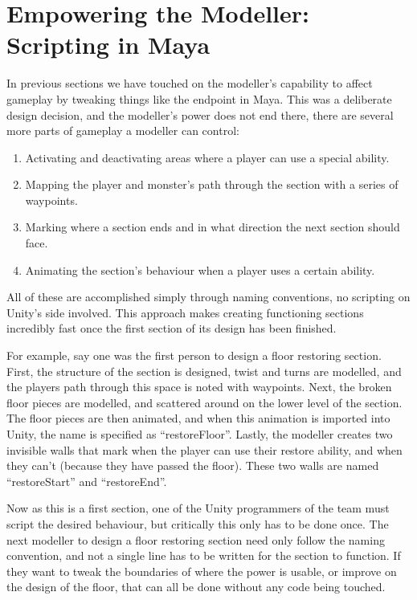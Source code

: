 \documentclass[a4paper,oneside]{memoir}
\begin{document}
		\section{Empowering the Modeller: Scripting in Maya}

			In previous sections we have touched on the modeller's capability to affect gameplay by tweaking things like the endpoint in Maya. 
			This was a deliberate design decision, and the modeller's power does not end there, there are several more parts of gameplay a modeller can control:

				\begin{enumerate}
					\item Activating and deactivating areas where a player can use a special ability.
					\item Mapping the player and monster's path through the section with a series of waypoints.
					\item Marking where a section ends and in what direction the next section should face.
					\item Animating the section's behaviour when a player uses a certain ability.
				\end{enumerate}

			All of these are accomplished simply through naming conventions, no scripting on Unity's side involved. 
			This approach makes creating functioning sections incredibly fast once the first section of its design has been finished.

			For example, say one was the first person to design a floor restoring section.
			First, the structure of the section is designed, twist and turns are modelled, and the players path through this space is noted with waypoints.
			Next, the broken floor pieces are modelled, and scattered around on the lower level of the section.
			The floor pieces are then animated, and when this animation is imported into Unity, the name is specified as ``restoreFloor''.
			Lastly, the modeller creates two invisible walls that mark when the player can use their restore ability, and when they can't (because they have passed the floor).
			These two walls are named ``restoreStart'' and ``restoreEnd''.

			Now as this is a first section, one of the Unity programmers of the team must script the desired behaviour, but critically this only has to be done once.
			The next modeller to design a floor restoring section need only follow the naming convention, and not a single line has to be written for the section to function.
			If they want to tweak the boundaries of where the power is usable, or improve on the design of the floor, that can all be done without any code being touched.
\end{document}
